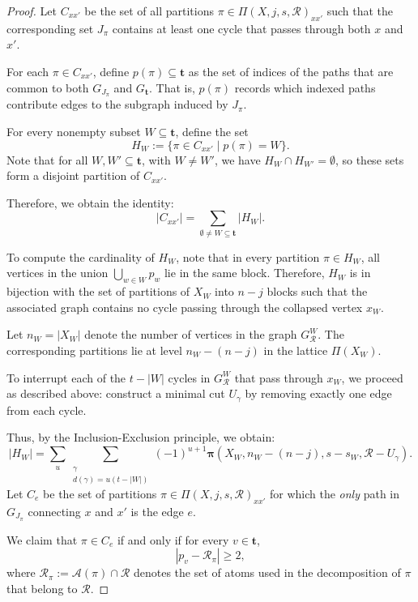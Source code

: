 \documentclass[10pt,a4paper]{amsart}
\begin{document}
\begin{proof}
		Let \( C_{xx'} \) be the set of all partitions \( \pi \in \Pi(X, j, s, \mathcal{R})_{xx'} \) such that the corresponding set \( J_{\pi} \) contains at least one cycle that passes through both \( x \) and \( x' \).
		
		For each \( \pi \in C_{xx'} \), define \( p(\pi) \subseteq \mathbf{t} \) as the set of indices of the paths that are common to both \( G_{J_{\pi}} \) and \( G_{\mathbf{t}} \). That is, \( p(\pi) \) records which indexed paths contribute edges to the subgraph induced by \( J_{\pi} \).
		
		For every nonempty subset \( W \subseteq \mathbf{t} \), define the set
		\[
		H_W := \{ \pi \in C_{xx'} \mid p(\pi) = W \}.
		\]
		Note that for all \( W, W' \subseteq \mathbf{t} \), with \( W \neq W' \), we have \( H_W \cap H_{W'} = \emptyset \), so these sets form a disjoint partition of \( C_{xx'} \).
		
		Therefore, we obtain the identity:
		\[
		|C_{xx'}| = \sum_{\emptyset \neq W \subseteq \mathbf{t}} |H_W|.
		\]
		
		To compute the cardinality of \( H_W \), note that in every partition \( \pi \in H_W \), all vertices in the union \( \bigcup_{w \in W} p_w \) lie in the same block. Therefore, \( H_W \) is in bijection with the set of partitions of \( X_W \) into \( n - j \) blocks such that the associated graph contains no cycle passing through the collapsed vertex \( x_W \).
		
		Let \( n_W = |X_W| \) denote the number of vertices in the graph \( G_{\mathcal{R}}^W \). The corresponding partitions lie at level \( n_W - (n - j) \) in the lattice \( \Pi(X_W) \).
		
		To interrupt each of the \( t - |W| \) cycles in \( G_{\mathcal{R}}^W \) that pass through \( x_W \), we proceed as described above: construct a minimal cut \( U_{\gamma} \) by removing exactly one edge from each cycle.
		
		Thus, by the Inclusion-Exclusion principle, we obtain:
		\[
		|H_W| = \sum_u \sum_{\substack{\gamma \\ d(\gamma) = u(t - |W|)}} (-1)^{u+1} \bm{\pi}(X_W, n_W - (n - j), s - s_W, \mathcal{R} - U_{\gamma}).
		\]
		Let \( C_e \) be the set of partitions \( \pi \in \Pi(X, j, s, \mathcal{R})_{xx'} \) for which the \emph{only} path in \( G_{J_{\pi}} \) connecting \( x \) and \( x' \) is the edge \( e \).
		
		We claim that \( \pi \in C_e \) if and only if for every \( v \in \mathbf{t} \),
		\[
		|p_v - \mathcal{R}_{\pi}| \geq 2,
		\]
		where \( \mathcal{R}_{\pi} := \mathcal{A}(\pi) \cap \mathcal{R} \) denotes the set of atoms used in the decomposition of \( \pi \) that belong to \( \mathcal{R} \).
		

\end{proof}
\end{document}
